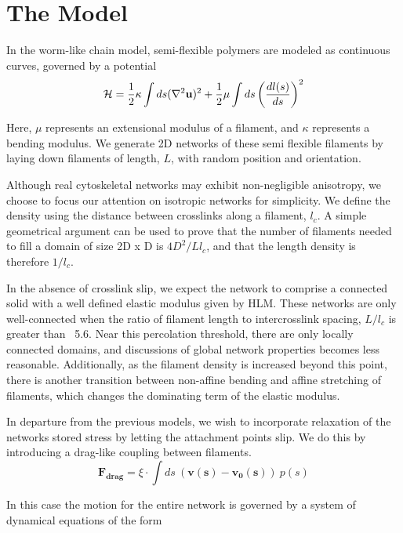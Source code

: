 \documentclass[prb,11pt]{revtex4-1}
\begin{document}
\section{The Model}

In the worm-like chain model, semi-flexible polymers are modeled as continuous curves, governed by a potential 
\begin{equation}
{\cal H} =\frac{1}{2}\kappa \int ds(\nabla^2\mathbf{u})^2 + \frac{1}{2}\mu \int ds \left ( \frac{dl(s) }{ds} \right )^2
\end{equation}

Here, $\mu$ represents an extensional modulus of a filament, and $\kappa$ represents a bending modulus.  We generate 2D networks of these semi flexible filaments by laying down filaments of length, $L$, with random position and orientation.  

Although real cytoskeletal networks may exhibit non-negligible anisotropy, we choose to focus our attention on isotropic networks for simplicity.  We define the density using the distance between crosslinks along a filament, $l_c$. A simple geometrical argument can be used to prove that the number of filaments needed to fill a domain of size 2D x D is $4D^2/Ll_c$, and that the length density is therefore $1/l_c$. 

In the absence of crosslink slip, we expect the network to comprise a connected solid with a well defined elastic modulus given by HLM.  These networks are only well-connected when the ratio of filament length to intercrosslink spacing, $L/l_c$ is greater than ~5.6.  Near this percolation threshold, there are only locally connected domains, and discussions of global network properties becomes less reasonable.  Additionally, as the filament density is increased beyond this point, there is another transition between non-affine bending and affine stretching of filaments, which changes the dominating term of the elastic modulus.

In departure from the previous models, we wish to incorporate relaxation of the networks stored stress by letting the attachment points slip.  We do this by introducing a drag-like coupling between filaments.
\begin{equation}
\mathbf{F_{drag}} = \xi \cdot \int ds \: (\mathbf{v(s)}-\mathbf{v_0(s)}) \: p(s)
\end{equation}

In this case the motion for the entire network is governed by a system of dynamical equations of the form
\end{document}
